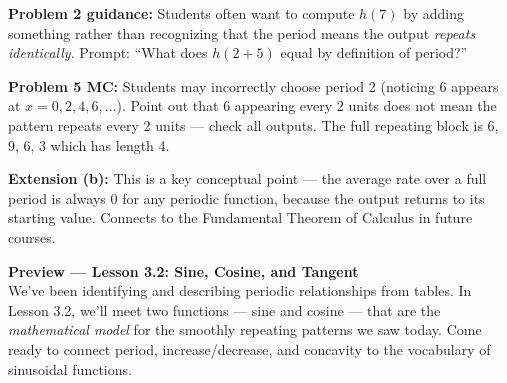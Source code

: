 \documentclass[10pt]{article}
\begin{document}
\begin{teachernote}
\textbf{Problem 2 guidance:} Students often want to compute $h(7)$ by adding
something rather than recognizing that the period means the output \emph{repeats
identically}. Prompt: ``What does $h(2+5)$ equal by definition of period?''

\textbf{Problem 5 MC:} Students may incorrectly choose period 2 (noticing
6 appears at $x=0,2,4,6,\ldots$). Point out that 6 appearing every 2 units
does not mean the pattern repeats every 2 units --- check all outputs. The
full repeating block is 6, 9, 6, 3 which has length 4.

\textbf{Extension (b):} This is a key conceptual point --- the average rate
over a full period is always 0 for any periodic function, because the output
returns to its starting value. Connects to the Fundamental Theorem of Calculus
in future courses.
\end{teachernote}

\begin{tcolorbox}[colback=navylight, colframe=navy, arc=2mm,
    left=3mm, right=3mm, top=2mm, bottom=2mm]
\small\textbf{Preview --- Lesson 3.2: Sine, Cosine, and Tangent}\\
We've been identifying and describing periodic relationships from tables.
In Lesson 3.2, we'll meet two functions --- sine and cosine --- that are
the \emph{mathematical model} for the smoothly repeating patterns we saw
today. Come ready to connect period, increase/decrease, and concavity
to the vocabulary of sinusoidal functions.
\end{tcolorbox}
\end{document}
